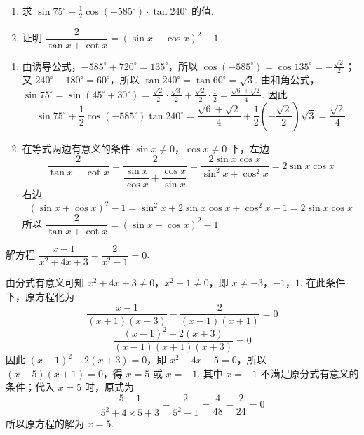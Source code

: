 \begin{problem}
\begin{enumerate}
\item 求 \( \sin75^\circ+\frac{1}{2}\cos\left(-585^\circ\right)\cdot\tan240^\circ \) 的值.
\item 证明 \( \dfrac{2}{\tan x+\cot x}=(\sin x+\cos x)^2-1 \).
\end{enumerate}
\end{problem}

\begin{solution}
\begin{enumerate}
\item 由诱导公式，\(-585^\circ+720^\circ=135^\circ\)，所以 \(\cos\left(-585^\circ\right)=\cos135^\circ=-\frac{\sqrt{2}}{2}\)；又 \(240^\circ-180^\circ=60^\circ\)，所以 \(\tan240^\circ=\tan60^\circ=\sqrt{3}\). 由和角公式，\(\sin75^\circ=\sin\left(45^\circ+30^\circ\right)=\frac{\sqrt{2}}{2}\cdot\frac{\sqrt{3}}{2}+\frac{\sqrt{2}}{2}\cdot\frac{1}{2}=\frac{\sqrt{6}+\sqrt{2}}{4}\). 因此
\[
\sin75^\circ+\frac{1}{2}\cos\left(-585^\circ\right)\tan240^\circ
=\frac{\sqrt{6}+\sqrt{2}}{4}+\frac{1}{2}\left(-\frac{\sqrt{2}}{2}\right)\sqrt{3}=\frac{\sqrt{2}}{4}
\]

\item 在等式两边有意义的条件 \(\sin x\ne0\)，\(\cos x\ne0\) 下，左边
\[
\frac{2}{\tan x+\cot x}=\frac{2}{\dfrac{\sin x}{\cos x}+\dfrac{\cos x}{\sin x}}=\frac{2\sin x\cos x}{\sin^2x+\cos^2x}=2\sin x\cos x
\]
右边
\[
(\sin x+\cos x)^2-1=\sin^2x+2\sin x\cos x+\cos^2x-1=2\sin x\cos x
\]
所以 \(\dfrac{2}{\tan x+\cot x}=(\sin x+\cos x)^2-1\).
\end{enumerate}
\end{solution}

\begin{problem}
解方程 \( \dfrac{x-1}{x^2+4x+3}-\dfrac{2}{x^2-1}=0 \).
\end{problem}

\begin{solution}
由分式有意义可知 \(x^2+4x+3\ne0\)，\(x^2-1\ne0\)，即 \(x\ne-3\)，\(-1\)，\(1\). 在此条件下，原方程化为
\[
\frac{x-1}{(x+1)(x+3)}-\frac{2}{(x-1)(x+1)}=0
\]
\[
\frac{(x-1)^2-2(x+3)}{(x-1)(x+1)(x+3)}=0
\]
因此 \((x-1)^2-2(x+3)=0\)，即 \(x^2-4x-5=0\)，所以 \((x-5)(x+1)=0\)，得 \(x=5\) 或 \(x=-1\). 其中 \(x=-1\) 不满足原分式有意义的条件；代入 \(x=5\) 时，原式为
\[
\frac{5-1}{5^2+4\times5+3}-\frac{2}{5^2-1}=\frac{4}{48}-\frac{2}{24}=0
\]
所以原方程的解为 \(x=5\).
\end{solution}

